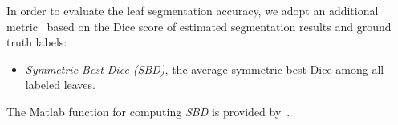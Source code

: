 In order to evaluate the leaf segmentation accuracy, we adopt an additional metric~\cite{scharr2014annotated} based on the Dice score of estimated segmentation results and ground truth labels:
\begin{itemize}
\item {\it{Symmetric Best Dice (SBD)}}, the average symmetric best Dice among all labeled leaves.
\end{itemize}
The Matlab function for computing {\it{SBD}} is provided by~\cite{scharr2014annotated}.


%

